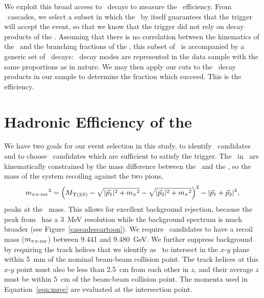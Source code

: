 \documentclass{cornell}
\begin{document}
We exploit this broad access to \us\ decays to measure the \us\
efficiency.  From \twotoone\ cascades, we select a subset in which the
\pipi\ by itself guarantees that the trigger will accept the event, so
that we know that the trigger did not rely on decay products of the
\us.  Assuming that there is no correlation between the kinematics of
the \pipi\ and the branching fractions of the \us, this subset of
\pipi\ is accompanied by a generic set of \us\ decays: \us\ decay
modes are represented in the data sample with the same proportions as
in nature.  We may then apply our cuts to the \us\ decay products in
our sample to determine the fraction which succeed.  This is the
efficiency.

\section{Hadronic Efficiency of the \boldmath \us}
\label{sec:usefficiency}

We have two goals for our event selection in this study, to identify
\twotoone\ candidates and to choose \pipi\ candidates which are
sufficient to satisfy the trigger.  The \pipi\ in \twotoone\ are
kinematically constrained by the mass difference between the \uss\ and
the \us, so the mass of the system recoiling against the two pions,
\begin{equation}
  {m_{\mbox{\scriptsize $\pi\pi$-rec}}}^2 = \left(M_{\Upsilon(2S)} - \sqrt{|\vec{p}_1|^2 + {m_\pi}^2}
  - \sqrt{|\vec{p}_2|^2 + {m_\pi}^2}\right)^2 - |\vec{p}_1 + \vec{p}_2|^2 \mbox{,}
  \label{eqn:mrec}
\end{equation}
peaks at the \us\ mass.  This allows for excellent background
rejection, because the peak from \twotoone\ has a 3~MeV resolution
while the background spectrum is much broader (see
Figure~\ref{cascadescartoon}).  We require \pipi\ candidates to have a
recoil mass ($m_{\mbox{\scriptsize $\pi\pi$-rec}}$) between 9.441 and 9.480~GeV.  We
further suppress background by requiring the track helices that we
identify as \pipi\ to intersect in the $x$-$y$ plane within 5~mm of
the nominal beam-beam collision point.  The track helices at this
$x$-$y$ point must also be less than 2.5~cm from each other in $z$,
and their average $z$ must be within 5~cm of the beam-beam collision
point.  The momenta used in Equation~\ref{eqn:mrec} are evaluated at
the intersection point.
\end{document}
